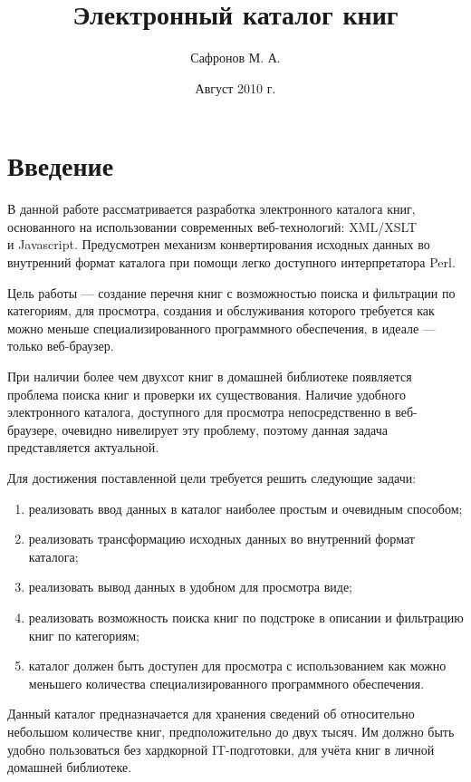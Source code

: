 \documentclass[a4paper,14pt,oneside]{extreport}
\title{Электронный каталог книг}
\author{Сафронов М. А.}
\date{Август 2010 г.}
\begin{document}
\begin{titlepage}
\maketitle
\end{titlepage}

\setcounter{page}{2}

\tableofcontents

\newpage

\chapter{Введение}
В данной работе рассматривается разработка электронного каталога книг, основанного на использовании современных веб-технологий: XML/XSLT \\ и Javascript.
Предусмотрен механизм конвертирования исходных данных во внутренний формат каталога при помощи легко доступного интерпретатора Perl.

Цель работы --- создание перечня книг с возможностью поиска и фильтрации по категориям, для просмотра, создания и обслуживания которого требуется как можно меньше специализированного программного обеспечения, в идеале --- только веб-браузер.

При наличии более чем двухсот книг в домашней библиотеке появляется проблема поиска книг и проверки их существования. Наличие удобного электронного каталога, доступного для просмотра непосредственно в веб-браузере, очевидно нивелирует эту проблему, поэтому данная задача представляется актуальной.

Для достижения поставленной цели требуется решить следующие задачи:
\begin{enumerate}
\item реализовать ввод данных в каталог наиболее простым и очевидным способом;
\item реализовать трансформацию исходных данных во внутренний формат каталога;
\item реализовать вывод данных в удобном для просмотра виде;
\item реализовать возможность поиска книг по подстроке в описании и фильтрацию книг по категориям;
\item каталог должен быть доступен для просмотра с использованием как можно меньшего количества специализированного программного обеспечения.
\end{enumerate}

Данный каталог предназначается для хранения сведений об относительно небольшом количестве книг, предположительно до двух тысяч. Им должно быть удобно пользоваться без хардкорной IT-подготовки, для учёта книг в личной домашней библиотеке.
\end{document}
